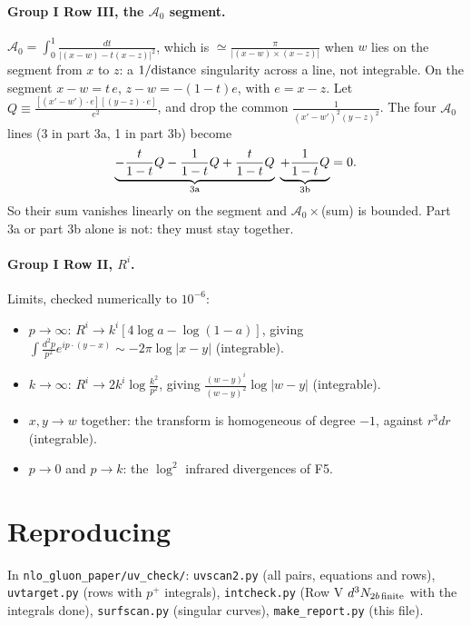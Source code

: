 \documentclass[10pt]{article}
\begin{document}
\paragraph{Group I Row III, the $\mathcal A_0$ segment.} $\mathcal A_0=\int_0^1\frac{dt}{|(x-w)-t(x-z)|^2}$, which is $\simeq\frac{\pi}{|(x-w)\times(x-z)|}$ when $w$ lies on the segment from $x$ to $z$: a $1/{\rm distance}$ singularity across a line, not integrable. On the segment $x-w=t\,e$, $z-w=-(1-t)e$, with $e=x-z$. Let $Q\equiv\frac{[(x'-w')\cdot e][(y-z)\cdot e]}{e^2}$, and drop the common $\frac{1}{(x'-w')^2(y-z)^2}$. The four $\mathcal A_0$ lines (3 in part 3a, 1 in part 3b) become
\begin{equation*}
\underbrace{-\frac{t}{1-t}Q-\frac{1}{1-t}Q+\frac{t}{1-t}Q}_{\rm 3a}\;\underbrace{+\frac{1}{1-t}Q}_{\rm 3b}=0.
\end{equation*}
So their sum vanishes linearly on the segment and $\mathcal A_0\times$(sum) is bounded. Part 3a or part 3b alone is not: they must stay together.

\paragraph{Group I Row II, $R^i$.} Limits, checked numerically to $10^{-6}$:
\begin{itemize}
\item $p\to\infty$: $R^i\to k^i[4\log a-\log(1-a)]$, giving $\int\frac{d^2p}{p^2}e^{ip\cdot(y-x)}\sim-2\pi\log|x-y|$ (integrable).
\item $k\to\infty$: $R^i\to2k^i\log\frac{k^2}{p^2}$, giving $\frac{(w-y)^i}{(w-y)^2}\log|w-y|$ (integrable).
\item $x,y\to w$ together: the transform is homogeneous of degree $-1$, against $r^3dr$ (integrable).
\item $p\to0$ and $p\to k$: the $\log^2$ infrared divergences of F5.
\end{itemize}

\section*{Reproducing}
In \texttt{nlo\_gluon\_paper/uv\_check/}: \texttt{uvscan2.py} (all pairs, equations and rows), \texttt{uvtarget.py} (rows with $p^+$ integrals), \texttt{intcheck.py} (Row V $d^3N_{2b\,\rm finite}$ with the integrals done), \texttt{surfscan.py} (singular curves), \texttt{make\_report.py} (this file).
\end{document}
